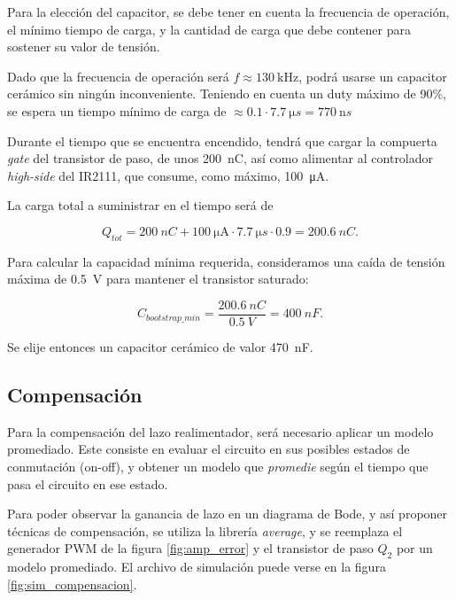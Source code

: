 \documentclass[]{article}
\begin{document}
	Para la elección del capacitor, se debe tener en cuenta la frecuencia de operación, el mínimo tiempo de carga, y la cantidad de carga que debe contener para sostener su valor de tensión.
	
	Dado que la frecuencia de operación será $f\approx\SI{130}{\kilo\hertz}$, podrá usarse un capacitor cerámico sin ningún inconveniente. Teniendo en cuenta un duty máximo de 90\%, se espera un tiempo mínimo de carga de $\approx 0.1 \cdot \SI{7.7}{\micro s} = \SI{770}{\nano s}$
	
	Durante el tiempo que se encuentra encendido, tendrá que cargar la compuerta \textit{gate} del transistor de paso, de unos \SI{200}{nC}, así como alimentar al controlador \textit{high-side} del IR2111, que consume, como máximo, \SI{100}{\micro\ampere}.
	
	La carga total a suministrar en el tiempo será de 
	
	\begin{equation}
		Q_{tot} = \SI{200}{nC} + \SI{100}{\micro\ampere} \cdot \SI{7.7}{\micro s} \cdot 0.9 = \SI{200.6}{nC}.
	\end{equation}
	
	Para calcular la capacidad mínima requerida, consideramos una caída de tensión máxima de \SI{0.5}{V} para mantener el transistor saturado:
	
	\begin{equation}
		C_{bootstrap\_min} = \frac{\SI{200.6}{nC}}{\SI{0.5}{V}} =  \SI{400}{nF}.
	\end{equation}
	
	Se elije entonces un capacitor cerámico de valor \SI{470}{nF}.
	
	
	
	\subsection{Compensación}
	
	Para la compensación del lazo realimentador, será necesario aplicar un modelo promediado. Este consiste en evaluar el circuito en sus posibles estados de conmutación (on-off), y obtener un modelo que \textit{promedie} según el tiempo que pasa el circuito en ese estado.
	
	Para poder observar la ganancia de lazo en un diagrama de Bode, y así proponer técnicas de compensación, se utiliza la librería \textit{average}, y se reemplaza el generador PWM de la figura \ref{fig:amp_error} y el transistor de paso $Q_2$ por un modelo promediado. El archivo de simulación puede verse en la figura \ref{fig:sim_compensacion}.
	
\end{document}
